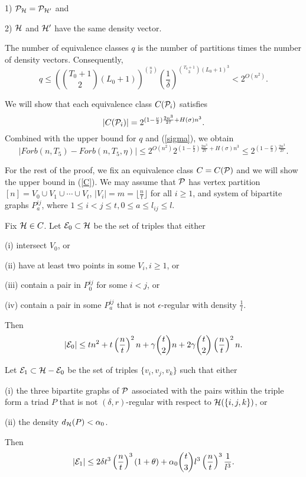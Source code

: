\documentclass[11pt]{article}
\begin{document}
1) ${\cal P}_{\mathcal{H}}={\cal P}_{\mathcal{H}'}$ and

2) $\mathcal{H}$ and $\mathcal{H}'$ have the same density vector.


The number of equivalence classes $q$ is the number of partitions
times the number of  density vectors.  Consequently,
$$q\le \left({T_0 +1\choose 2}(L_0+1)\right)^{n \choose 2}
\left(\frac{1}{\delta}\right)^{{T_0+1 \choose 3}(L_0+1)^3}<2^{O(n^2)}.$$


 We will show that each equivalence class $C({\cal P}_i)$ satisfies
\begin{equation} \label{C} |C(\cP_i)|=2^{(1-\frac{\nu}{2})\frac{2n^3}{27}+H(\sigma) n^3}.\end{equation}
Combined with the upper bound for $q$ and (\ref{sigma}), we
obtain
$$|Forb(n, T_5) -Forb(n, T_5, \eta)|\le 2^{O(n^2)}2^{(1-\frac{\nu}{2})\frac{2n^3}{27}+H(\sigma)n^3}\le
2^{(1-\frac{\nu}{3})\frac{2n^3}{27}}.$$

For the rest of the proof, we fix an equivalence class $C=C({\cal P})$
and we will show the upper bound in (\ref{C}).  We may assume that
${\cal P}$ has vertex partition $[n]=V_0\cup V_1\cup \cdots \cup V_t$,
$|V_i|=m=\lfloor \frac{n}{t}\rfloor$ for all $i\ge 1$, and system of
bipartite graphs $P_{a}^{ij}$, where $1\le i<j\le t, 0\le a\le
l_{ij} \le l$.

 Fix $\mathcal{H} \in C$.  Let ${\cal E}_0\subset \mathcal{H}$ be the set of triples that either

 (i) intersect $V_0$, or

 (ii) have at least two points in some
$V_i, i\ge 1$, or

 (iii) contain a pair in $P_0^{ij}$ for some $i<j$, or

 (iv) contain a pair in some $P_{a}^{ij}$ that is not $\epsilon$-regular with density $\frac1l$.


 Then
 $$|{\cal E}_0|\le tn^2+t\left(\frac{n}{t}\right)^2 n +\gamma{t \choose 2}n+2\gamma{t \choose 2}\left(\frac{n}{t}\right)^2 n.$$

  Let ${\cal E}_1 \subset \mathcal{H}-{\cal E}_0$ be the set of triples $\{v_i, v_j, v_k\}$ such that either

  (i) the three bipartite graphs of ${\cal P}$  associated with the pairs within the triple form
  a triad $P$ that is not $(\delta, r)$-regular with respect to $\mathcal{H}(\{i,j,k\})$, or

  (ii) the density $d_{\mathcal{H}}(P)<\alpha_0$.

 Then
 $$|{\cal E}_1|\le 2\delta t^3\left(\frac{n}{t}\right)^3(1+\theta) +\alpha_0
 {t \choose 3}l^3\left(\frac{n}{t}\right)^3 \frac{1}{l^3}.$$
\end{document}

